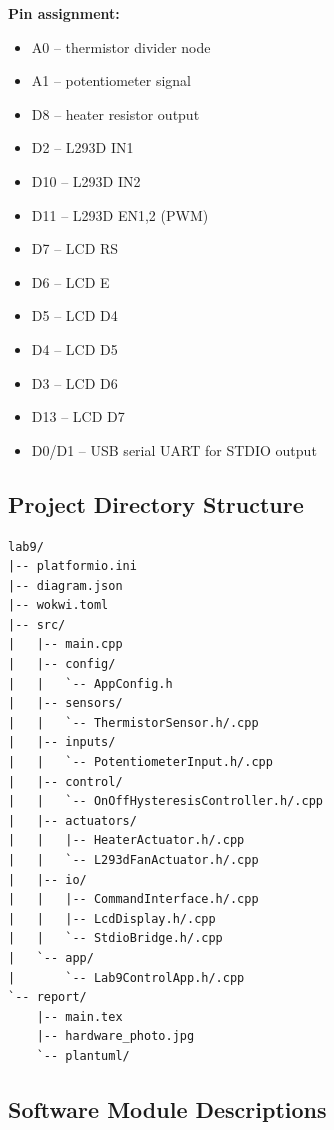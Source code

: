 \documentclass[12pt]{article}
\begin{document}
\textbf{Pin assignment:}
\begin{itemize}
    \item A0 -- thermistor divider node
    \item A1 -- potentiometer signal
    \item D8 -- heater resistor output
    \item D2 -- L293D IN1
    \item D10 -- L293D IN2
    \item D11 -- L293D EN1,2 (PWM)
    \item D7 -- LCD RS
    \item D6 -- LCD E
    \item D5 -- LCD D4
    \item D4 -- LCD D5
    \item D3 -- LCD D6
    \item D13 -- LCD D7
    \item D0/D1 -- USB serial UART for STDIO output
\end{itemize}

\subsection{Project Directory Structure}

\begin{verbatim}
lab9/
|-- platformio.ini
|-- diagram.json
|-- wokwi.toml
|-- src/
|   |-- main.cpp
|   |-- config/
|   |   `-- AppConfig.h
|   |-- sensors/
|   |   `-- ThermistorSensor.h/.cpp
|   |-- inputs/
|   |   `-- PotentiometerInput.h/.cpp
|   |-- control/
|   |   `-- OnOffHysteresisController.h/.cpp
|   |-- actuators/
|   |   |-- HeaterActuator.h/.cpp
|   |   `-- L293dFanActuator.h/.cpp
|   |-- io/
|   |   |-- CommandInterface.h/.cpp
|   |   |-- LcdDisplay.h/.cpp
|   |   `-- StdioBridge.h/.cpp
|   `-- app/
|       `-- Lab9ControlApp.h/.cpp
`-- report/
    |-- main.tex
    |-- hardware_photo.jpg
    `-- plantuml/
\end{verbatim}

\subsection{Software Module Descriptions}
\end{document}
